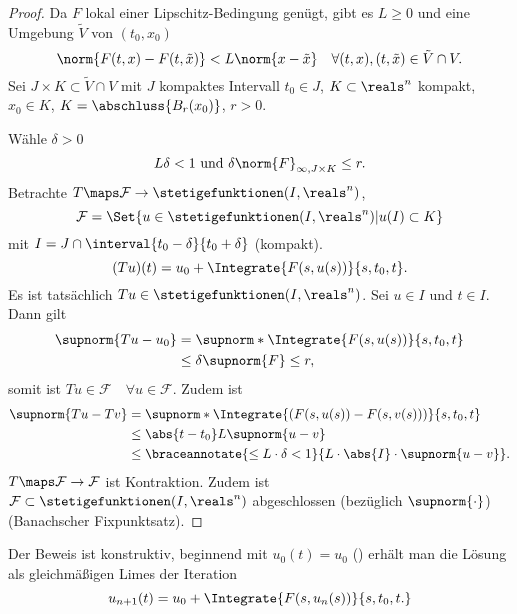 \begin{proof}
  Da \( F \) lokal einer Lipschitz-Bedingung genügt, gibt es \( L\geq 0 \) und eine Umgebung \( \tilde{V} \) von \( (t_0,x_0) \) \sd
  \begin{equation*}
    \norm{F(t,x)-F(t,\tilde{x})}< L\norm{x-\tilde{x}}\quad \forall (t,x),(t,\tilde{x})\in \tilde{V}\cap V.
  \end{equation*}
  Sei \( J\times K\subset \tilde{V}\cap V \) mit \( J \) kompaktes Intervall \( t_0\in J \), \( K\subset \reals^n \) kompakt, \( x_0\in K \), \obda \( K=\abschluss{B_r(x_0)} \), \( r>0 \). 
  
  Wähle \( \delta>0 \) \sd
  \begin{equation*}
    L\delta<1 \text{ und }\delta\norm{F}_{\infty, J\times K}\leq r.
  \end{equation*}
  Betrachte \( T\maps \mathcal{F}\to \stetigefunktionen(I,\reals^n) \),
  \begin{equation*}
    \mathcal{F}=\Set{u\in \stetigefunktionen(I,\reals^n)|u(I)\subset K}
  \end{equation*}
  mit \( I=J\cap \interval{t_0-\delta}{t_0+\delta} \) (kompakt).
  \begin{equation*}
    (Tu)(t)=u_0+\Integrate{F(s,u(s))}{s,t_0,t}.
  \end{equation*}
  Es ist tatsächlich \( Tu\in \stetigefunktionen(I,\reals^n) \). Sei \( u\in I \) und \( t\in I \). Dann gilt
  \begin{align*}
    \supnorm{Tu-u_0}&=\supnorm*{\Integrate{F(s,u(s))}{s,t_0,t}}\\
    &\leq \delta\supnorm{F}\leq r,
  \end{align*}
  somit ist \( Tu\in \mathcal{F}\quad \forall u\in \mathcal{F} \). Zudem ist 
  \begin{align*}
    \supnorm{Tu-Tv}&=\supnorm*{\Integrate{(F(s,u(s))-F(s,v(s)))}{s,t_0,t}}\\
    &\leq\abs{t-t_0}L\supnorm{u-v}\\
    &\leq \braceannotate{\leq L\cdot \delta<1}{L\cdot \abs{I}\cdot\supnorm{u-v}}.
  \end{align*}
  \timplies \( T\maps \mathcal{F}\to \mathcal{F} \) ist Kontraktion. Zudem ist \( \mathcal{F}\subset \stetigefunktionen(I,\reals^n) \)   abgeschlossen (bezüglich \( \supnorm{\cdot} \)) \timplies \Beh (Banachscher Fixpunktsatz).

  
\end{proof}
\begin{bemerkung*}
  Der Beweis ist konstruktiv, \dh beginnend mit \( u_0(t)=u_0 \) (\zb) erhält man die Lösung als gleichmäßigen Limes der Iteration
  \begin{equation*}
    u_{n+1}(t)=u_0+\Integrate{F(s,u_n(s))}{s,t_0,t.}
  \end{equation*}
\end{bemerkung*}
